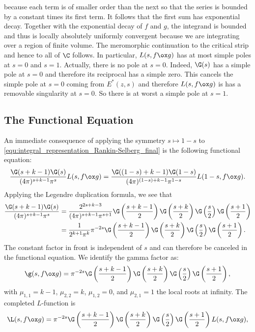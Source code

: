       because each term is of smaller order than the next so that the series is bounded by a constant times its first term. It follows that the first sum has exponential decay. Together with the exponential decay of $f$ and $g$, the integrand is bounded and thus is locally absolutely uniformly convergent because we are integrating over a region of finite volume. The meromorphic continuation to the critical strip and hence to all of $\C$ follows. In particular, $L(s,f \ox g)$ has at most simple poles at $s = 0$ and $s = 1$. Actually, there is no pole at $s = 0$. Indeed, $\G(s)$ has a simple pole at $s = 0$ and therefore its reciprocal has a simple zero. This cancels the simple pole at $s = 0$ coming from $E^{\ast}(z,s)$ and therefore $L(s,f \ox g)$ is has a removable singularity at $s = 0$. So there is at worst a simple pole at $s = 1$.
    \subsection*{The Functional Equation}
      An immediate consequence of applying the symmetry $s \mapsto 1-s$ to \cref{equ:integral_representation_Rankin-Selberg_final} is the following functional equation:
      \[
        \frac{\G(s+k-1)\G(s)}{(4\pi)^{s+k-1}\pi^{s}}L(s,f \ox g) = \frac{\G((1-s)+k-1)\G(1-s)}{(4\pi)^{(1-s)+k-1}\pi^{1-s}}L(1-s,f \ox g).
      \]
      Applying the Legendre duplication formula, we see that
      \begin{align*}
        \frac{\G(s+k-1)\G(s)}{(4\pi)^{s+k-1}\pi^{s}} &= \frac{2^{2s+k-3}}{(4\pi)^{s+k-1}\pi^{s+1}}\G\left(\frac{s+k-1}{2}\right)\G\left(\frac{s+k}{2}\right)\G\left(\frac{s}{2}\right)\G\left(\frac{s+1}{2}\right) \\
        &= \frac{1}{2^{k+1}\pi^{k}}\pi^{-2s}\G\left(\frac{s+k-1}{2}\right)\G\left(\frac{s+k}{2}\right)\G\left(\frac{s}{2}\right)\G\left(\frac{s+1}{2}\right).
      \end{align*}
      The constant factor in front is independent of $s$ and can therefore be canceled in the functional equation. We identify the gamma factor as:
      \[
        \g(s,f \ox g) = \pi^{-2s}\G\left(\frac{s+k-1}{2}\right)\G\left(\frac{s+k}{2}\right)\G\left(\frac{s}{2}\right)\G\left(\frac{s+1}{2}\right),
      \]
      with $\mu_{1,1} = k-1$, $\mu_{2,2} = k$, $\mu_{1,2} = 0$, and $\mu_{2,1} = 1$ the local roots at infinity. The completed $L$-function is
      \[
        \L(s,f \ox g) = \pi^{-2s}\G\left(\frac{s+k-1}{2}\right)\G\left(\frac{s+k}{2}\right)\G\left(\frac{s}{2}\right)\G\left(\frac{s+1}{2}\right)L(s,f \ox g),
      \]
